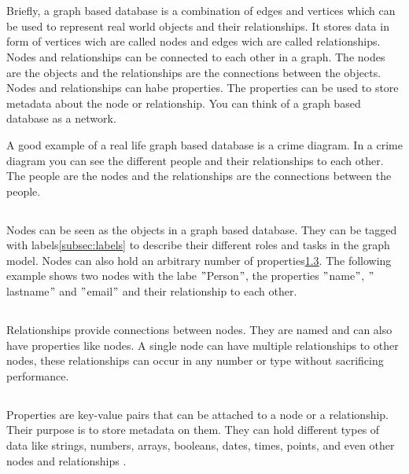 \usepackage{lipsum}
\usepackage{listings}
\usepackage{hyperref}%

\section{}
Briefly, a graph based database is a combination of edges and vertices which  can be used to represent real world
objects and their relationships.
It stores data in form of vertices wich are called nodes and edges wich are called relationships.
Nodes and relationships can be connected to each other in a graph.
The nodes are the objects and the relationships are the connections between the objects.
Nodes and relationships can habe properties.
The properties can be used to store metadata about the node or relationship.\cite[P. 6f. ]{PractivalNeo4j}
You can think of a graph based database as a network.

A good example of a real life graph based database is a crime diagram.
In a crime diagram you can see the different people and their relationships to each other.
The people are the nodes and the relationships are the connections between the people. \cite[compare P. 6f. ]{BeginningNeo4j}

\subsection{}
Nodes can be seen as the objects in a graph based database.
They can be tagged with labels\ref{subsec:labels} to describe their different roles and tasks in the graph model.
Nodes can also hold an arbitrary number of properties\ref{subsec:tbd{properties}}.
The following example shows two nodes with the labe \("\)Person\("\), the properties \("\)name\("\), \("\)lastname\("\)
and \("\)email\("\) and their relationship to each other\cite[compare P. 6f. ]{PractivalNeo4j}.
\subsection{}\label{subsec:tbd{relationships}}
Relationships provide connections between nodes.
They are named and can also have properties like nodes.
A single node can have multiple relationships to other nodes, these relationships can occur in any number or type without
sacrificing performance\cite[compare ]{Neo4j:allgemeines}.
\subsection{} \label{subsec:tbd{properties}}
Properties are key-value pairs that can be attached to a node or a relationship.
Their purpose is to store metadata on them.
They can hold different types of data like strings, numbers, arrays, booleans, dates, times, points, and even other nodes and relationships \cite[compare ]{neo4j:Values} \cite[compare]{neo4j:Graph}.
